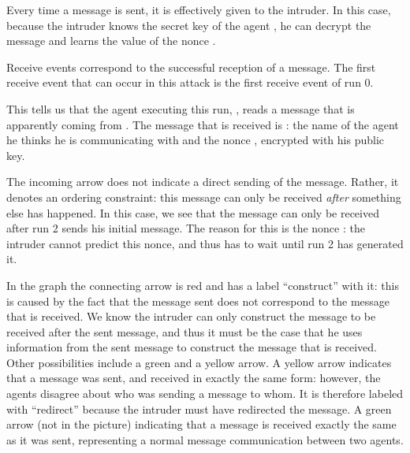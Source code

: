 \documentclass{book}
\begin{document}

Every time a message is sent, it is effectively given to the intruder.
In this case, because the intruder knows the secret key  of
the agent , he can decrypt the message and learns the value of
the nonce .

Receive events correspond to the successful reception of a message. The
first receive event that can
occur in this attack is the first receive event of run 0.


This tells us that the agent executing this run, , reads a
message that is apparently coming from . The message that
is received is  : the name of the
agent he thinks he is communicating with and the nonce ,
encrypted with his public key.

The incoming arrow does not indicate a direct sending of the message.
Rather, it denotes an ordering constraint: this message can only be
received
{\em after} something else has happened. In this case, we see that the
message can only be received after run 2 sends his initial message. The
reason for this is the nonce : the intruder cannot predict
this nonce, and thus has to wait until run 2 has generated it.

In the graph the connecting arrow is red and has a label ``construct''
with it: this is caused by the fact that the message sent does not
correspond to the message that is received. We know the intruder can only
construct the message to be received after the sent message, and thus it
must be the case that he uses information from the sent message to
construct the message that is received. Other possibilities include a green
and a yellow arrow. A yellow arrow indicates that a message was sent,
and received in exactly the same form: however, the agents disagree about
who was sending a message to whom. It is therefore labeled with
``redirect'' because the intruder must have redirected the message. A
green arrow (not in the picture) indicating that a message is received
exactly the same as it was sent, representing a normal message
communication between two agents.
\end{document}
